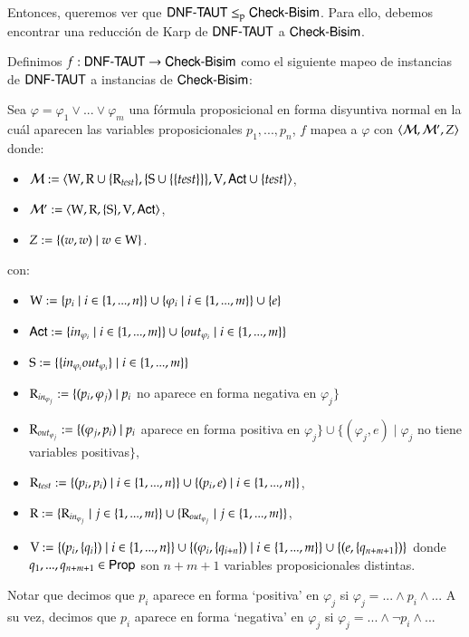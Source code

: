Entonces, queremos ver que $\DNFTAUT \leq_p \CBisim$. Para ello, debemos encontrar una reducción de Karp de $\DNFTAUT$ a $\CBisim$.

\begin{definicion}\label{def:karp-reduction}
    Definimos $f : \DNFTAUT \rightarrow \CBisim$ como el siguiente mapeo de instancias de $\DNFTAUT$ a instancias de $\CBisim$:

    Sea $\varphi = \varphi_1 \vee ... \vee \varphi_m$ una fórmula proposicional en forma disyuntiva normal en la cuál aparecen las variables 
    proposicionales $p_1,...,p_n$, $f$ mapea a $\varphi$ con $\tup{\model,\model',Z}$ donde:
    \begin{itemize}
        \item $\model := \tup{\W, \R \cup \{\R_{test}\}, \{\S \cup \{\{test\}\}\}, \V, \ACT \cup \{test\}}$,
        \item $\model' := \tup{\W, \R, \{\S\}, \V, \ACT}$,
        \item $Z := \{(w,w) \mid w \in \W\}$.
    \end{itemize}
    con:
    \begin{itemize}
        \item $\W := \{p_i\mid i\in\{1,...,n\}\} \cup \{\varphi_i \mid i \in \{1,...,m\}\} \cup \{e\}$
        \item $\ACT := \{in_{\varphi_i} \mid i \in \{1,...,m\}\} \cup \{out_{\varphi_i} \mid i \in \{1,...,m\}\}$
        \item $\S := \{\{in_{\varphi_i}out_{\varphi_i}\} \mid i \in \{1,...,m\}\}$
        \item $\R_{in_{\varphi_j}} := \{(p_i,\varphi_j) \mid p_i$ no aparece en forma negativa en $\varphi_j\}$
        \item $\R_{out_{\varphi_j}} := \{(\varphi_j,p_i) \mid p_i$ aparece en forma positiva en $\varphi_j\} \cup \{(\varphi_j,e) \mid \varphi_j$ no tiene variables positivas$\}$,        
        \item $\R_{test} := \{(p_i,p_i) \mid i \in \{1,...,n\}\} \cup \{(p_i,e)\mid i\in \{1,...,n\}\}$,
        \item $\R := \{\R_{in_{\varphi_j}}\mid j \in \{1,...,m\}\} \cup \{\R_{out_{\varphi_j}}\mid j \in \{1,...,m\}\}$,
        \item $\V := \{(p_i,\{q_i\}) \mid i \in \{1,...,n\}\} \cup 
                     \{(\varphi_i,\{q_{i+n}\}) \mid i \in \{1,...,m\}\} \cup 
                     \{(e,\{q_{n+m+1}\})\}$ donde $q_1,...,q_{n+m+1} \in \PROP$ son $n+m+1$ variables proposicionales distintas.
    \end{itemize}
    Notar que decimos que $p_i$ aparece en forma `positiva' en $\varphi_j$ si $\varphi_j = ... \wedge p_i \wedge...$
    A su vez, decimos que $p_i$ aparece en forma `negativa' en $\varphi_j$ si $\varphi_j = ...\wedge \neg p_i \wedge...$


\end{definicion}
